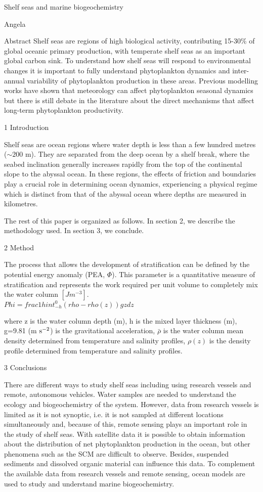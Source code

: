 \documentclass{article}
\begin{document}
Shelf seas and marine biogeochemistry

Angela

Abstract
Shelf seas are regions of high biological activity, contributing 15-30\% of global oceanic primary production, with temperate shelf seas as an important global carbon sink. To understand how shelf seas will respond to environmental changes it is important to fully understand phytoplankton dynamics and inter-annual variability of phytoplankton production in these areas. Previous modelling works have shown that meteorology can affect phytoplankton seasonal dynamics but there is still debate in the literature about the direct mechanisms that affect long-term phytoplankton productivity. 


1 Introduction 

Shelf seas are ocean regions where water depth is less than a few hundred metres ($\sim 200$ m). They are separated from the deep ocean by a shelf break, where the seabed inclination generally increases rapidly from the top of the continental slope to the abyssal ocean. In these regions, the effects of friction and boundaries play a crucial role in determining ocean dynamics, experiencing a physical regime which is distinct from that of the abyssal ocean where depths are measured in kilometres. 

The rest of this paper is organized as follows. In section 2, we describe the methodology used. In section 3, we conclude.

2 Method

The process that allows the development of stratification can be defined by the potential energy anomaly (PEA, $\Phi$). This parameter is a quantitative measure of stratification and represents the work required per unit volume to completely mix the water column $[Jm^{-3}]$. \\

   $  Phi=frac{1}{h}int_{-h}^{0}({rho}-rho(z))gzdz $

where z is the water column depth (m), h is the mixed layer thickness (m), g=9.81 (m $\rm s^{-2}$) is the gravitational acceleration, $\bar{\rho}$ is the water column mean density determined from temperature and salinity profiles, $\rho(z)$ is the density profile determined from temperature and salinity 
profiles. 

3 Conclusions

There are different ways to study shelf seas including using research vessels and remote, autonomous vehicles. Water samples are needed to understand the ecology and biogeochemistry of the system. However, data from research vessels is limited as it is not synoptic, i.e. it is not sampled at different locations simultaneously and, because of this, remote sensing plays an important role in the study of shelf seas. With satellite data it is possible to obtain information about the distribution of net phytoplankton production in the ocean, but other phenomena such as the SCM are difficult to observe. Besides, suspended sediments and dissolved organic material can influence this data. To complement the available data from research vessels and remote sensing, ocean models are used to study and understand marine biogeochemistry. 
\end{document}
